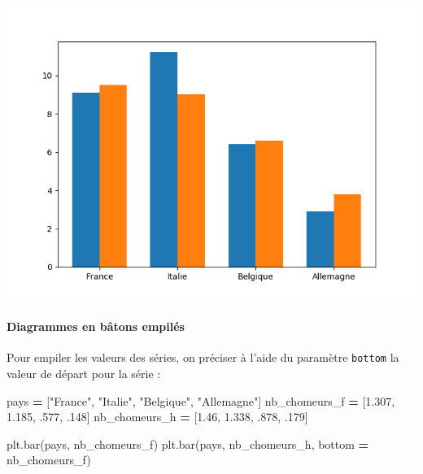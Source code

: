 \documentclass[12pt,]{book}
\newenvironment{Shaded}{\begin{snugshade}}{\end{snugshade}}
\newcommand{\DecValTok}[1]{\textcolor[rgb]{0.00,0.00,0.81}{#1}}
\newcommand{\FloatTok}[1]{\textcolor[rgb]{0.00,0.00,0.81}{#1}}
\newcommand{\StringTok}[1]{\textcolor[rgb]{0.31,0.60,0.02}{#1}}
\newcommand{\OperatorTok}[1]{\textcolor[rgb]{0.81,0.36,0.00}{\textbf{#1}}}
\newcommand{\NormalTok}[1]{#1}
\let\oldparagraph\paragraph
\renewcommand{\paragraph}[1]{\oldparagraph{#1}\mbox{}}
\numberwithin{equation}{section}
\numberwithin{countremarque}{section}
\begin{document}
\begin{center}\includegraphics[width=9.03in]{figs/pyplot/barplot_mulltiples} \end{center}

\paragraph{Diagrammes en bâtons
empilés}\label{diagrammes-en-batons-empiles}

Pour empiler les valeurs des séries, on préciser à l'aide du paramètre
\texttt{bottom} la valeur de départ pour la série :

\begin{Shaded}
\begin{Highlighting}[]
\NormalTok{pays }\OperatorTok{=}\NormalTok{ [}\StringTok{"France"}\NormalTok{, }\StringTok{"Italie"}\NormalTok{, }\StringTok{"Belgique"}\NormalTok{, }\StringTok{"Allemagne"}\NormalTok{]}
\NormalTok{nb_chomeurs_f }\OperatorTok{=}\NormalTok{ [}\FloatTok{1.307}\NormalTok{, }\FloatTok{1.185}\NormalTok{, .}\DecValTok{577}\NormalTok{, .}\DecValTok{148}\NormalTok{]}
\NormalTok{nb_chomeurs_h }\OperatorTok{=}\NormalTok{ [}\FloatTok{1.46}\NormalTok{, }\FloatTok{1.338}\NormalTok{, .}\DecValTok{878}\NormalTok{, .}\DecValTok{179}\NormalTok{]}

\NormalTok{plt.bar(pays, nb_chomeurs_f)}
\NormalTok{plt.bar(pays, nb_chomeurs_h, bottom }\OperatorTok{=}\NormalTok{ nb_chomeurs_f)}
\end{Highlighting}
\end{Shaded}
\end{document}

